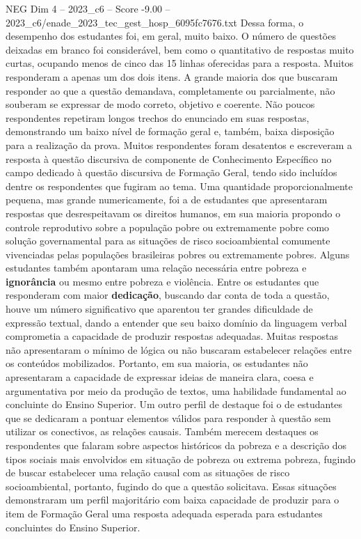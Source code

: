 \begin{textsample}{NEG Dim 4 – 2023\_c6 – Score -9.00 – 2023\_c6/enade\_2023\_tec\_gest\_hosp\_6095fc7676.txt}
Dessa forma, o desempenho dos estudantes foi, em geral, muito baixo.
O número de questões deixadas em branco foi considerável, bem como o quantitativo de respostas muito curtas, ocupando menos de cinco das 15 linhas oferecidas para a resposta.
Muitos responderam a apenas um dos dois itens.
A grande maioria dos que buscaram responder ao que a questão demandava, completamente ou parcialmente, não souberam se expressar de modo correto, objetivo e coerente.
Não poucos respondentes repetiram longos trechos do enunciado em suas respostas, demonstrando um baixo nível de formação geral e, também, baixa disposição para a realização da prova.
Muitos respondentes foram desatentos e escreveram a resposta à questão discursiva de componente de Conhecimento Específico no campo dedicado à questão discursiva de Formação Geral, tendo sido incluídos dentre os respondentes que fugiram ao tema.
Uma quantidade proporcionalmente pequena, mas grande numericamente, foi a de estudantes que apresentaram respostas que desrespeitavam os direitos humanos, em sua maioria propondo o controle reprodutivo sobre a população pobre ou extremamente pobre como solução governamental para as situações de risco socioambiental comumente vivenciadas pelas populações brasileiras pobres ou extremamente pobres.
Alguns estudantes também apontaram uma relação necessária entre pobreza e \textbf{ignorância} ou mesmo entre pobreza e violência.
Entre os estudantes que responderam com maior \textbf{dedicação}, buscando dar conta de toda a questão, houve um número significativo que aparentou ter grandes dificuldade de expressão textual, dando a entender que seu baixo domínio da linguagem verbal comprometia a capacidade de produzir respostas adequadas.
Muitas respostas não apresentaram o mínimo de lógica ou não buscaram estabelecer relações entre os conteúdos mobilizados.
Portanto, em sua maioria, os estudantes não apresentaram a capacidade de expressar ideias de maneira clara, coesa e argumentativa por meio da produção de textos, uma habilidade fundamental ao concluinte do Ensino Superior.
Um outro perfil de destaque foi o de estudantes que se dedicaram a pontuar elementos válidos para responder à questão sem utilizar os conectivos, as relações causais.
Também merecem destaques os respondentes que falaram sobre aspectos históricos da pobreza e a descrição dos tipos sociais mais envolvidos em situação de pobreza ou extrema pobreza, fugindo de buscar estabelecer uma relação causal com as situações de risco socioambiental, portanto, fugindo do que a questão solicitava.
Essas situações demonstraram um perfil majoritário com baixa capacidade de produzir para o item de Formação Geral uma resposta adequada esperada para estudantes concluintes do Ensino Superior.

\end{textsample}
